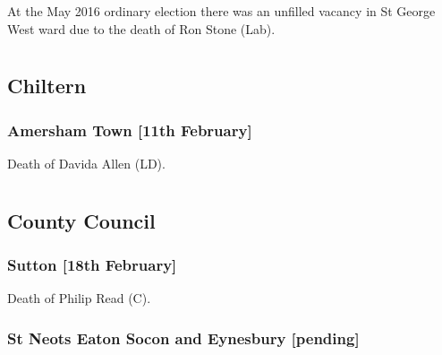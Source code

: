 \documentclass[a4paper,openany]{book}
\begin{document}
\begin{resultsiii}
At the May 2016 ordinary election there was an unfilled vacancy in St George West ward due to the death of Ron Stone (Lab).

\section[Buckinghamshire]{}

\subsection*{Chiltern}

\subsubsection*{Amersham Town \hspace*{\fill}\nolinebreak[1]%
\enspace\hspace*{\fill}
[11th February]}


Death of Davida Allen (LD).

\section[Cambridgeshire]{}

\subsection*{County Council}

\subsubsection*{Sutton \hspace*{\fill}\nolinebreak[1]%
\enspace\hspace*{\fill}
[18th February]}


Death of Philip Read (C).

\subsubsection*{St Neots Eaton Socon and Eynesbury \hspace*{\fill}\nolinebreak[1]%
\enspace\hspace*{\fill}
[pending]}


\end{resultsiii}
\end{document}
